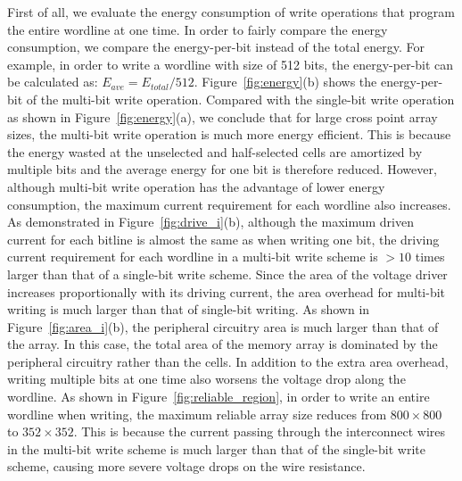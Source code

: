 First of all, we evaluate the energy consumption of write operations
that program the entire wordline at one time. In order to fairly
compare the energy consumption, we compare the energy-per-bit instead of
the total energy. For example, in order to write a wordline with size of
512 bits, the energy-per-bit can be calculated as: $E_{ave}=E_{total}/512$. Figure~\ref{fig:energy}(b) shows the energy-per-bit of the multi-bit write operation. Compared with the single-bit write operation as shown in Figure~\ref{fig:energy}(a), we conclude that for large cross point array
sizes, the multi-bit write operation is much more energy efficient. This
is because the energy wasted at the unselected and half-selected cells are
amortized by multiple bits and the average energy for one bit is therefore
reduced. However, although multi-bit write operation has the advantage
of lower energy consumption, the maximum current requirement for each
wordline also increases. As demonstrated in Figure~\ref{fig:drive_i}(b),
although the maximum driven current for each bitline is almost the same as when writing one bit, the driving current requirement for each wordline
in a multi-bit write scheme is $>10$ times larger than that of a single-bit write scheme. Since the area of the voltage driver increases
proportionally with its driving current, the area overhead for multi-bit
writing is much larger than that of single-bit writing. As shown in
Figure~\ref{fig:area_i}(b), the peripheral circuitry area is much
larger than that of the array. In this case, the total area of the memory
array is dominated by the peripheral circuitry rather than the
cells.
In addition to the extra area overhead, writing multiple bits at one time
also worsens the voltage drop along the wordline. As shown in Figure~\ref{fig:reliable_region}, in order to write an entire wordline when writing, the maximum reliable array size reduces from $800 \times 800$ to $352 \times 352$. This is because the current passing through the interconnect wires in the multi-bit write scheme is much larger than that of the single-bit write scheme, causing more severe voltage drops on the wire resistance.

